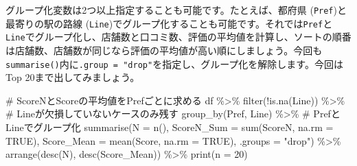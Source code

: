 \documentclass[
  a4paper,
  pandoc,
  ja=standard,
  jafont=haranoaji]{bxjsbook}
\newenvironment{Shaded}{\begin{snugshade}}{\end{snugshade}}
\newcommand{\AttributeTok}[1]{\textcolor[rgb]{0.00,0.48,0.65}{#1}}
\newcommand{\CommentTok}[1]{\textcolor[rgb]{0.37,0.37,0.37}{#1}}
\newcommand{\ConstantTok}[1]{\textcolor[rgb]{0.56,0.35,0.01}{#1}}
\newcommand{\DecValTok}[1]{\textcolor[rgb]{0.68,0.00,0.00}{#1}}
\newcommand{\FunctionTok}[1]{\textcolor[rgb]{0.28,0.35,0.67}{#1}}
\newcommand{\NormalTok}[1]{\textcolor[rgb]{0.00,0.48,0.65}{#1}}
\newcommand{\SpecialCharTok}[1]{\textcolor[rgb]{0.37,0.37,0.37}{#1}}
\newcommand{\StringTok}[1]{\textcolor[rgb]{0.13,0.47,0.30}{#1}}
\begin{document}
グループ化変数は2つ以上指定することも可能です。たとえば、都府県
(\texttt{Pref})と最寄りの駅の路線
(\texttt{Line})でグループ化することも可能です。それでは\texttt{Pref}と\texttt{Line}でグループ化し、店舗数と口コミ数、評価の平均値を計算し、ソートの順番は店舗数、店舗数が同じなら評価の平均値が高い順にしましょう。今回も\texttt{summarise()}内に\texttt{.group\ =\ "drop"}を指定し、グループ化を解除します。今回はTop
20まで出してみましょう。

\begin{Shaded}
\begin{Highlighting}[numbers=left,,]
\CommentTok{\# ScoreNとScoreの平均値をPrefごとに求める}
\NormalTok{df }\SpecialCharTok{\%\textgreater{}\%}
  \FunctionTok{filter}\NormalTok{(}\SpecialCharTok{!}\FunctionTok{is.na}\NormalTok{(Line)) }\SpecialCharTok{\%\textgreater{}\%} \CommentTok{\# Lineが欠損していないケースのみ残す}
  \FunctionTok{group\_by}\NormalTok{(Pref, Line) }\SpecialCharTok{\%\textgreater{}\%} \CommentTok{\# PrefとLineでグループ化}
  \FunctionTok{summarise}\NormalTok{(}\AttributeTok{N           =} \FunctionTok{n}\NormalTok{(),}
            \AttributeTok{ScoreN\_Sum  =} \FunctionTok{sum}\NormalTok{(ScoreN,  }\AttributeTok{na.rm =} \ConstantTok{TRUE}\NormalTok{),}
            \AttributeTok{Score\_Mean  =} \FunctionTok{mean}\NormalTok{(Score,  }\AttributeTok{na.rm =} \ConstantTok{TRUE}\NormalTok{),}
            \AttributeTok{.groups     =} \StringTok{"drop"}\NormalTok{) }\SpecialCharTok{\%\textgreater{}\%}
  \FunctionTok{arrange}\NormalTok{(}\FunctionTok{desc}\NormalTok{(N), }\FunctionTok{desc}\NormalTok{(Score\_Mean)) }\SpecialCharTok{\%\textgreater{}\%}
  \FunctionTok{print}\NormalTok{(}\AttributeTok{n =} \DecValTok{20}\NormalTok{)}
\end{Highlighting}
\end{Shaded}
\end{document}
